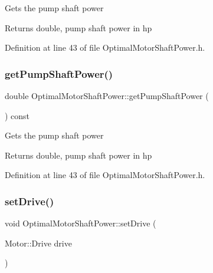 Gets the pump shaft power \begin{DoxyReturn}{Returns}
double, pump shaft power in hp 
\end{DoxyReturn}


Definition at line 43 of file Optimal\+Motor\+Shaft\+Power.\+h.

\mbox{\label{class_optimal_motor_shaft_power_aca7bb632c659ecf2ebf3cb9fdb23626f}} 
\subsubsection{\texorpdfstring{get\+Pump\+Shaft\+Power()}{getPumpShaftPower()}\hspace{0.1cm}{\footnotesize\ttfamily [3/3]}}
{\footnotesize\ttfamily double Optimal\+Motor\+Shaft\+Power\+::get\+Pump\+Shaft\+Power (\begin{DoxyParamCaption}{ }\end{DoxyParamCaption}) const\hspace{0.3cm}{\ttfamily [inline]}}

Gets the pump shaft power \begin{DoxyReturn}{Returns}
double, pump shaft power in hp 
\end{DoxyReturn}


Definition at line 43 of file Optimal\+Motor\+Shaft\+Power.\+h.

\mbox{\label{class_optimal_motor_shaft_power_a8f3288a69848c61f4e8e2b14da549d16}} 
\subsubsection{\texorpdfstring{set\+Drive()}{setDrive()}\hspace{0.1cm}{\footnotesize\ttfamily [1/3]}}
{\footnotesize\ttfamily void Optimal\+Motor\+Shaft\+Power\+::set\+Drive (\begin{DoxyParamCaption}\item[{Motor\+::\+Drive}]{drive }\end{DoxyParamCaption})\hspace{0.3cm}{\ttfamily [inline]}}


